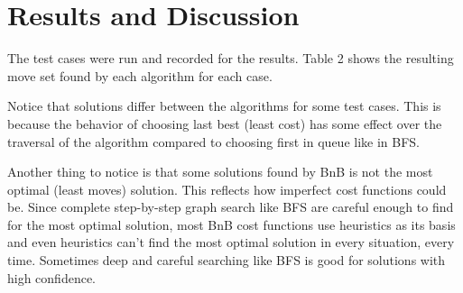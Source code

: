 \clearpage

\section{Results and Discussion}

\par The test cases were run and recorded for the results. Table 2 shows the resulting move set found by each algorithm for each case.

\par Notice that solutions differ between the algorithms for some test cases. This is because the behavior of choosing last best (least cost) has some effect over the traversal of the algorithm compared to choosing first in queue like in BFS.

\par Another thing to notice is that some solutions found by BnB is not the most optimal (least moves) solution. This reflects how imperfect cost functions could be. Since complete step-by-step graph search like BFS are careful enough to find for the most optimal solution, most BnB cost functions use heuristics as its basis and even heuristics can't find the most optimal solution in every situation, every time. Sometimes deep and careful searching like BFS is good for solutions with high confidence.

